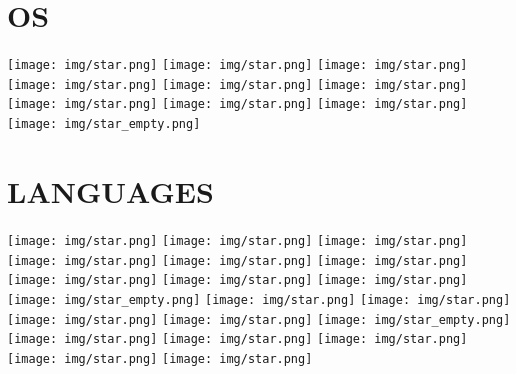 \documentclass[]{cv-class}
\begin{document}
\begin{aside}
  \section{OS}
    {\texttt{[image: img/star.png]}
    \texttt{[image: img/star.png]}
    \texttt{[image: img/star.png]}
    \texttt{[image: img/star.png]}
    \texttt{[image: img/star.png]}}
    {\texttt{[image: img/star.png]}
    \texttt{[image: img/star.png]}
    \texttt{[image: img/star.png]}
    \texttt{[image: img/star.png]}
    \texttt{[image: img/star\_empty.png]}}
    ~
  \section{LANGUAGES}
    {\texttt{[image: img/star.png]}
    \texttt{[image: img/star.png]}
    \texttt{[image: img/star.png]}
    \texttt{[image: img/star.png]}
    \texttt{[image: img/star.png]}}
    {\texttt{[image: img/star.png]}
    \texttt{[image: img/star.png]}
    \texttt{[image: img/star.png]}
    \texttt{[image: img/star.png]}
    \texttt{[image: img/star\_empty.png]}}
    {\texttt{[image: img/star.png]}
    \texttt{[image: img/star.png]}
    \texttt{[image: img/star.png]}
    \texttt{[image: img/star.png]}
    \texttt{[image: img/star\_empty.png]}}
    {\texttt{[image: img/star.png]}
    \texttt{[image: img/star.png]}
    \texttt{[image: img/star.png]}
    \texttt{[image: img/star.png]}
    \texttt{[image: img/star.png]}}
    ~

\end{aside}
\end{document}
